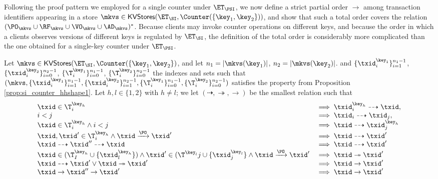 Following the proof pattern we employed for a single counter under $\ET_{\PSI}$, we now 
define a strict partial order $\rightarrow$ among transaction identifiers appearing in a store 
$\mkvs \in \mathsf{KVStores}(\ET_{\SI},  \Counter(\{\key_1, \key_2\}))$, and show that such a 
total order covers the relation $(\PO_{\mkvs} \cup \RF_{\mkvs} \cup \VO_{\mkvs} \cup \AD_{\mkvs})^{\ast}$. 
Because clients may invoke counter operations on different keys, and because the 
order in which a clients observes versions of different keys is regulated by $\ET_{\SI}$, 
the definition of the total order is considerably more complicated than the one 
obtained for a single-key counter under $\ET_\PSI$.

\begin{definition}
\label{def:si_counter_order}
Let $\mkvs \in \mathsf{KVStores}(\ET_{\SI}, \Counter(\{\key_1, \key_2\})$, and let 
$n_1 = \lvert \mkvs(\key_1) \rvert$, $n_2 = \lvert \mkvs(\key_2) \rvert$. 
and $\{\txid_{i}^{\key_1}\}_{i=1}^{n_1 - 1}$, $\{\txid_{i}^{\key_2}\}_{i=0}^{n_2 - 1}$, 
$\{\T_{i}^{\key_1}\}_{i=0}^{n_1-1}$, $\{\T_{i}^{\key_2}\}_{i=0}^{n_2 - 1}$ the indexes 
and sets such that $(\mkvs, \{\txid_{i}^{\key_{1}}\}_{i=1}^{n_1 - 1}, \{\txid^{\key_2}_{i}\}_{i=1}^{n_2 - 1}, 
\{\T_{i}^{\key_1}\}_{i=0}^{n_1 - 1}, \{\T_{i}^{\key_2}\}_{i=0}^{n_2-1})$ satisfies the property from 
Proposition \ref{prop:si_counter_hhshape1}. Let $h, l \in \{1,2\}$ with $h \neq l$; we 
let $(\dashrightarrow, \twoheadrightarrow, \rightarrow)$ be the smallest relation such that 
\[
\begin{array}{ll}
\txid \in \T^{\key_{h}}_{i} &\implies \txid^{\key_{h}}_{i} \dashrightarrow \txid,\\
i < j &\implies \txid_{i} \dashrightarrow \txid_{j},\\
\txid \in \T^{\key_{h}}_{i} \wedge i < j & \implies \txid \dashrightarrow \txid^{\key_{h}}_{j}\\
\txid, \txid' \in \T^{\key_{h}}_{i} \wedge \txid \xrightarrow{\PO} \txid' &\implies \txid \dashrightarrow \txid'\\
\txid \dashrightarrow \txid'' \dashrightarrow \txid &\implies \txid \dashrightarrow \txid'\\
\txid \in (\T^{\key_{h}}_{I} \cup \{\txid^{\key_{h}}_{l}\}) \wedge \txid' \in (\T^{\key_{l}}{j} \cup \{\txid^{\key_l}_{j}\} \wedge \txid \xrightarrow{\PO} \txid' &\implies \txid \twoheadrightarrow \txid'\\
\txid \dashrightarrow \txid' \vee \txid \twoheadrightarrow \txid' &\implies \txid \rightarrow \txid'\\
\txid \rightarrow \txid'' \rightarrow \txid' &\implies \txid \rightarrow \txid'
\end{array}
\]
%
\end{definition}
